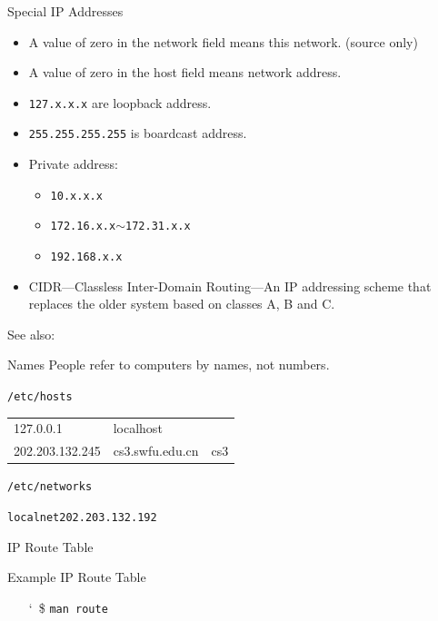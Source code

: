 \begin{frame}{Special IP Addresses}
  \begin{itemize}
  \item A value of zero in the network field means this network. (source only)
  \item A value of zero in the host field means network address.
  \item \texttt{127.x.x.x} are loopback address.
  \item \texttt{255.255.255.255} is boardcast address.
  \item Private address:
    \begin{itemize}
    \item \texttt{10.x.x.x}
    \item \texttt{172.16.x.x}$\sim$\texttt{172.31.x.x}
    \item \texttt{192.168.x.x}
    \end{itemize}
  \item CIDR---Classless Inter-Domain Routing---An IP addressing scheme that replaces the older
    system based on classes A, B and C.
  \end{itemize}
\end{frame}

See also: 

\begin{frame}{Names}
  People refer to computers by names, not numbers.
  \begin{block}{\texttt{/etc/hosts}}
    \begin{center}{\ttfamily
      \begin{tabular}{lll}
        127.0.0.1 & localhost&\\
        202.203.132.245 & cs3.swfu.edu.cn & cs3\\
      \end{tabular}}
    \end{center}
  \end{block}

  \begin{block}{\texttt{/etc/networks}}
    \begin{center}
      \texttt{localnet}\qquad \texttt{202.203.132.192}
    \end{center}
  \end{block}
\end{frame}

\begin{frame}{IP Route Table}
  \begin{block}{Example IP Route Table}
    \begin{center}
    \end{center}
  \end{block}
  \begin{itemize}
  \item[\char`~\$] \texttt{man route}
  \end{itemize}
\end{frame}

